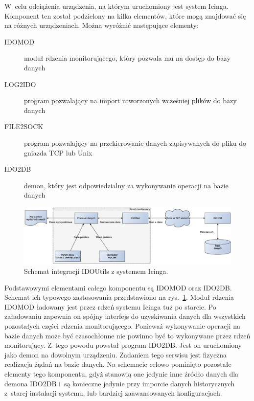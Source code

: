 W~celu odciążenia urządzenia, na którym uruchomiony jest system
Icinga. Komponent ten został podzielony na kilka elementów, które
mogą znajdować się na różnych urządzeniach. Można wyróżnić następujące
elementy:

\begin{description}
\item[IDOMOD] moduł rdzenia monitorującego, który pozwala mu na dostęp
  do bazy danych
\item[LOG2IDO] program pozwalający na import utworzonych wcześniej
  plików do bazy danych
\item[FILE2SOCK] program pozwalający na przekierowanie danych
  zapisywanych do pliku do gniazda TCP lub Unix
\item[IDO2DB] demon, który jest odpowiedzialny za wykonywanie operacji
  na bazie danych
\end{description}

\begin{figure}[ht]
  \caption{Schemat integracji IDOUtils z systemem Icinga.}
  \label{fig:IDOUtilsArch}
\includegraphics[width=1\textwidth]{img/idoutilsArch}
\end{figure}

Podstawowymi elementami całego komponentu są IDOMOD oraz
IDO2DB. Schemat ich typowego zastosowania przedstawiono na
rys.~\ref{fig:IDOUtilsArch}. Moduł rdzenia IDOMOD ładowany jest przez
rdzeń systemu Icinga tuż po starcie. Po załadowaniu zapewnia on spójny
interfejs do uzyskiwania danych dla wszystkich pozostałych części
rdzenia monitorującego. Ponieważ wykonywanie operacji na bazie danych
może być czasochłonne nie powinno być to wykonywane przez rdzeń
monitorujący. Z~tego powodu powstał program IDO2DB. Jest on
uruchomiony jako demon na dowolnym urządzeniu. Zadaniem tego serwisu
jest fizyczna realizacja żądań na bazie danych. Na schemacie celowo
pominięto pozostałe elementy tego komponentu, gdyż stanowią one
jedynie inne źródło danych dla demona IDO2DB i~są konieczne jedynie
przy imporcie danych historycznych z~starej instalacji systemu, lub
bardziej zaawansowanych konfiguracjach.


